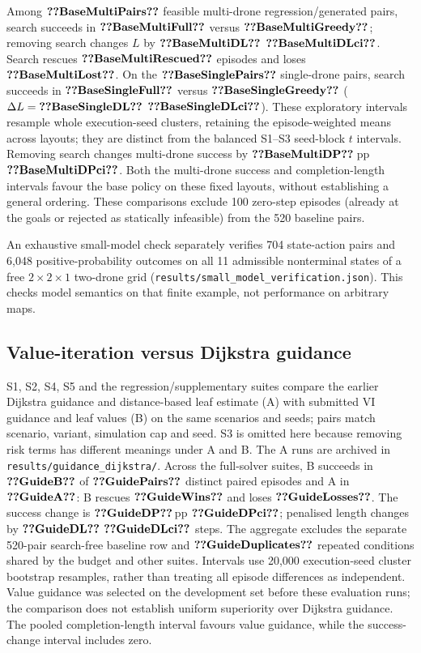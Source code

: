 Among $\val{BaseMultiPairs}$ feasible multi-drone regression/generated pairs,
search succeeds in $\val{BaseMultiFull}$ versus $\val{BaseMultiGreedy}$;
removing search changes $L$ by $\val{BaseMultiDL}$ $\val{BaseMultiDLci}$.
Search rescues $\val{BaseMultiRescued}$ episodes and loses
$\val{BaseMultiLost}$. On the $\val{BaseSinglePairs}$
single-drone pairs, search succeeds in $\val{BaseSingleFull}$ versus
$\val{BaseSingleGreedy}$ ($\Delta L=\val{BaseSingleDL}$ $\val{BaseSingleDLci}$).
These exploratory intervals resample whole execution-seed clusters,
retaining the episode-weighted means across layouts; they are distinct from
the balanced S1--S3 seed-block $t$ intervals. Removing search changes
multi-drone success by $\val{BaseMultiDP}$\,pp $\val{BaseMultiDPci}$.
Both the multi-drone success and completion-length intervals favour the
base policy on these fixed layouts, without establishing a general ordering.
These comparisons exclude 100 zero-step episodes (already at the goals
or rejected as statically infeasible) from the 520 baseline pairs.

An exhaustive small-model check separately verifies 704 state-action
pairs and 6,048 positive-probability outcomes on all 11 admissible
nonterminal states of a free $2\times2\times1$ two-drone grid
(\texttt{results/small\_model\_verification.json}). This checks model
semantics on that finite example, not performance on arbitrary maps.

\subsection{Value-iteration versus Dijkstra guidance}
\label{app:guidance-compare}
S1, S2, S4, S5 and the regression/supplementary suites compare the earlier
Dijkstra guidance and distance-based leaf estimate (A) with submitted
VI guidance and leaf values (B) on the same scenarios and seeds; pairs match
scenario, variant, simulation cap and seed. S3 is omitted here because
removing risk terms has different meanings under A and B. The A runs are archived in
\texttt{results/guidance\_dijkstra/}. Across the full-solver suites, B succeeds in
$\val{GuideB}$ of $\val{GuidePairs}$ distinct paired episodes and A in
$\val{GuideA}$: B rescues $\val{GuideWins}$ and loses $\val{GuideLosses}$.
The success change is $\val{GuideDP}$\,pp $\val{GuideDPci}$; penalised length
changes by $\val{GuideDL}$ $\val{GuideDLci}$ steps. The aggregate excludes
the separate 520-pair search-free baseline row and
$\val{GuideDuplicates}$ repeated conditions shared by the budget and other
suites. Intervals use 20,000 execution-seed cluster bootstrap resamples,
rather than treating all episode differences as independent. Value guidance
was selected on the development set before these evaluation runs; the
comparison does not establish uniform superiority over Dijkstra guidance.
The pooled completion-length interval favours value guidance, while the
success-change interval includes zero.

